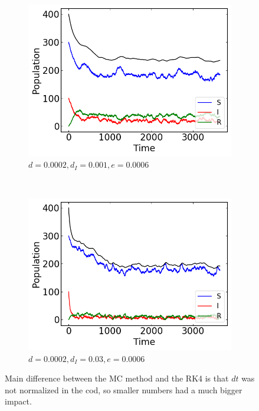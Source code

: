 \begin{figure}[H]
\begin{subfigure}{0.49\textwidth}
         \centering
         \includegraphics[width=\linewidth]{../fig/texfig/MC_vitaldynamic_d00002_dI001_e00006.png}
         \caption{$d = 0.0002, d_I = 0.001, e = 0.0006$}
    \end{subfigure}
     ~ 
    \begin{subfigure}{0.49\textwidth}
         \centering
         \includegraphics[width=\linewidth]{../fig/texfig/MC_vitaldynamic_d00002_dI003_e00006.png}
         \caption{$d = 0.0002, d_I = 0.03, e = 0.0006$}
    \end{subfigure}
    \caption{Main difference between the MC method and the RK4 is that $dt$ was not normalized in the cod, so smaller numbers had a much bigger impact.}
    \label{fig:RK4VD2}
\end{figure}


